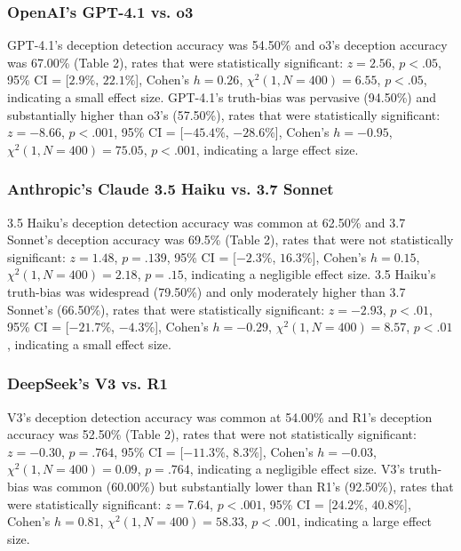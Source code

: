 \documentclass{article}
\begin{document}
\subsubsection{OpenAI's GPT-4.1 vs. o3}

GPT-4.1's deception detection accuracy was 54.50\% and o3's deception accuracy was 67.00\% (Table 2), rates that were statistically significant:  $z = 2.56$, $p < .05$, 95\% CI = [$2.9\%$, $22.1\%$], Cohen’s $h =0.26$, $\chi^2(1, N = 400) = 6.55$, $p < .05$, indicating a small effect size. GPT-4.1's truth-bias was pervasive (94.50\%) and substantially higher than o3's (57.50\%), rates that were statistically significant: $z = -8.66$, $p < .001$, 95\% CI = [$-45.4\%$, $-28.6\%$], Cohen’s $h = -0.95$, $\chi^2(1, N = 400) = 75.05$, $p < .001$, indicating a large effect size.

\subsubsection{Anthropic's Claude 3.5 Haiku vs. 3.7 Sonnet}

3.5 Haiku's deception detection accuracy was common at 62.50\% and 3.7 Sonnet's deception accuracy was 69.5\% (Table 2), rates that were not statistically significant:  $z = 1.48$, $p = .139$, 95\% CI = [$-2.3\%$, $16.3\%$], Cohen’s $h =0.15$, $\chi^2(1, N = 400) = 2.18$, $p = .15$, indicating a negligible effect size. 3.5 Haiku's truth-bias was widespread (79.50\%) and only moderately higher than 3.7 Sonnet's (66.50\%), rates that were statistically significant: $z = -2.93$, $p < .01$, 95\% CI = [$-21.7\%$, $-4.3\%$], Cohen’s $h = -0.29$, $\chi^2(1, N = 400) = 8.57$, $p < .01$, indicating a small effect size.

\subsubsection{DeepSeek's V3 vs. R1}

V3's deception detection accuracy was common at 54.00\% and R1's deception accuracy was 52.50\% (Table 2), rates that were not statistically significant:  $z = -0.30$, $p = .764$, 95\% CI = [$-11.3\%$, $8.3\%$], Cohen’s $h =-0.03$, $\chi^2(1, N = 400) = 0.09$, $p = .764$, indicating a negligible effect size. V3's truth-bias was common (60.00\%) but substantially lower than R1's (92.50\%), rates that were statistically significant: $z = 7.64$, $p < .001$, 95\% CI = [$24.2\%$, $40.8\%$], Cohen’s $h = 0.81$, $\chi^2(1, N = 400) = 58.33$, $p < .001$, indicating a large effect size.
\end{document}
